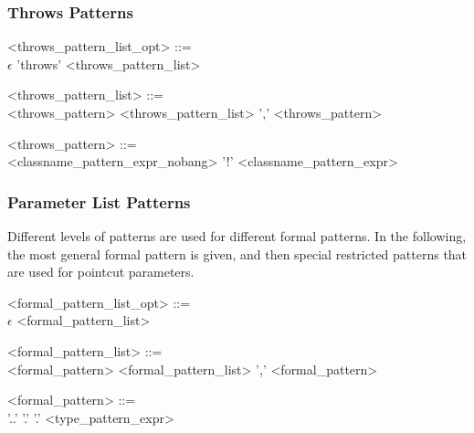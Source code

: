 \subsubsection{Throws Patterns}

\begin{minipage}{6in}
\begin{blue}
\begin{grammar}
<throws_pattern_list_opt> ::= \hspace{1in} \\
    $\epsilon$
\alt 'throws' <throws_pattern_list>

<throws_pattern_list> ::= \hspace{1in} \\
    <throws_pattern>
\alt <throws_pattern_list> ',' <throws_pattern>

<throws_pattern> ::= \hspace{1in} \\
      <classname_pattern_expr_nobang>
\alt  '!' <classname_pattern_expr>
\end{grammar} 
\end{blue}
\end{minipage}


\subsubsection{Parameter List Patterns}

Different levels of patterns are used for different formal patterns.  In the following,
the most general formal pattern is given,  and then special restricted patterns that
are used for pointcut parameters.


\begin{minipage}{6in}
\begin{blue}
\begin{grammar}
  <formal_pattern_list_opt> ::= \hspace{1in} \\
     $\epsilon$ 
\alt <formal_pattern_list>

<formal_pattern_list> ::=  \hspace{1in} \\
      <formal_pattern> 
\alt  <formal_pattern_list> ',' <formal_pattern>

<formal_pattern> ::=  \hspace{1in} \\
    '..' 
\alt '.' '.' 
\alt  <type_pattern_expr>
\end{grammar} 
\end{blue}
\end{minipage}

